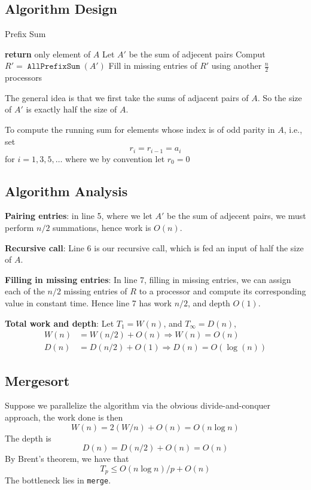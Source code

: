 \documentclass[11pt]{article}
\DeclareMathOperator{\AllPrefixSum}{\texttt{AllPrefixSum}}
\begin{document}
\subsection{Algorithm Design}
\label{sec:org6345776}
\begin{algorithm}
\caption{Prefix Sum}
\begin{algorithmic}[1]
    \State \textbf{return} only element of \(A\)
\EndIf
\State Let \(A'\) be the sum of adjecent pairs
\State Comput \(R'=\AllPrefixSum(A')\)
\State Fill in missing entries of \(R'\) using another \(\frac{n}{2}\) processors
\end{algorithmic}
\end{algorithm}

The general idea is that we first take the sums of adjacent pairs of \(A\). So the size
of \(A'\) is exactly half the size of \(A\).

To compute the running sum for elements whose index is of odd parity in \(A\), i.e., set
\begin{equation*}
r_i=r_{i-1}=a_i
\end{equation*}
for \(i=1,3,5,\dots\) where we by convention let \(r_0=0\)
\subsection{Algorithm Analysis}
\label{sec:orgfb9f726}
\textbf{Pairing entries}: in line 5, where we let \(A'\) be the sum of adjecent pairs, we must
perform \(n/2\) summations, hence work is \(O(n)\).

\textbf{Recursive call}: Line 6 is our recursive call, which is fed an input of half the size of \(A\).

\textbf{Filling in missing entries}: In line 7, filling in missing entries, we can assign each of
 the \(n/2\) missing entries of \(R\) to a processor and compute its corresponding value in
 constant time. Hence line 7 has work \(n/2\), and depth \(O(1)\).

\textbf{Total work and depth}: Let \(T_1=W(n)\), and \(T_\infty=D(n)\),
 \begin{align*}
W(n)&=W(n/2)+O(n)\Rightarrow W(n)=O(n)\\
D(n)&=D(n/2)+O(1)\Rightarrow D(n)=O(\log(n))
 \end{align*}
\subsection{Mergesort}
\label{sec:orga1315e8}
Suppose we parallelize the algorithm via the obvious divide-and-conquer approach, the work done
is then
\begin{equation*}
W(n)=2(W/n)+O(n)=O(n\log n)
\end{equation*}
The depth is
\begin{equation*}
D(n)=D(n/2)+O(n)=O(n)
\end{equation*}
By Brent's theorem, we have that
\begin{equation*}
T_p\le O(n\log n)/p+O(n)
\end{equation*}
The bottleneck lies in \texttt{merge}.
\end{document}
